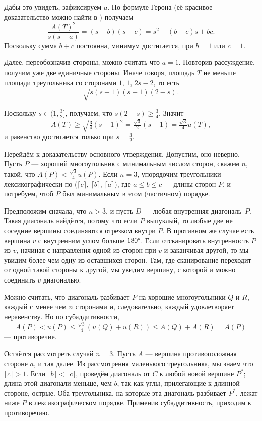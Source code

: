 Дабы это увидеть, зафиксируем $a$. 
По формуле Герона (её красивое доказательство можно найти в \cite{39}) получаем
\[\frac{A(T)^2}{s(s-a)}=(s-b)(s-c)=s^2-(b+c)s+bc.\]
Поскольку сумма $b + c$ постоянна, минимум достигается, при $b = 1$ или $c = 1$.

Далее, переобозначив стороны, можно считать что $a = 1$.
Повторив рассуждение, получим уже две единичные стороны.
Иначе говоря, площадь $T$ не меньше площади треугольника со сторонами $1$, $1$, $2s - 2$, то есть \[\sqrt{s(s-1)(s-1)(2-s)}.\]

Поскольку $s\in(1,\tfrac32]$, получаем, что $s(2-s)\geqslant \tfrac34$.
Значит 
\[A(T)\ge \sqrt{\tfrac34(s-1)^2}=\tfrac{\sqrt{3}}2(s-1)=\tfrac{\sqrt{3}}4u(T),\]
и равенство достигается только при $s=\tfrac32$.

Перейдём к доказательству основного утверждения.
Допустим, оно неверно.
Пусть $P$ --- хороший многоугольник с минимальным числом сторон, скажем $n$, такой, что $A(P)<\tfrac{\sqrt{3}}4 u(P)$.
Если $n=3$, упорядочим треугольники лексикографически по ($\lceil c\rceil$, $\lceil b\rceil$, $\lceil a\rceil$), где 
$a\leqslant b\leqslant c$ --- длины сторон $P$, и потребуем, чтоб $P$ был минимальным в этом (частичном) порядке.

Предположим сначала, что $n>3$, и пусть $D$ --- любая внутренняя диагональ~$P$.
Такая диагональ найдётся, потому что если $P$ выпуклый, то любые две не соседние вершины соединяются отрезком внутри $P$.
В противном же случае есть вершина $v$ с внутренним углом больше $180\degree$.
Если отсканировать внутренность $P$ из $v$, начиная с направления одной из сторон при $v$ и заканчивая другой,
то мы увидим более чем одну из оставшихся сторон.
Там, где сканирование переходит от одной такой стороны к другой, мы увидим вершину, с которой и можно соединить $v$ диагональю.

Можно считать, что диагональ разбивает $P$ на хорошие многоугольники $Q$ и $R$, каждый с менее чем $n$ сторонами и, следовательно, каждый удовлетворяет неравенству.
Но по субаддитивности, 
\[A(P)<u(P)\leqslant \tfrac{\sqrt{3}}4(u(Q)+u(R))\leqslant A(Q)+A(R)=A(P)\]
--- противоречие.

Остаётся рассмотреть случай $n=3$.
Пусть $A$ --- вершина противоположная стороне $a$, и так далее.
Из рассмотрения маленького треугольника, мы знаем что $\lceil c\rceil>1$.
Если $\lceil b\rceil<\lceil c\rceil$, проведём диагональ от $C$ к любой новой вершине $P^*$;
длина этой диагонали меньше, чем $b$, так как углы, прилегающие к длинной стороне, острые.
Оба треугольника, на которые эта диагональ разбивает $P^*$, лежат ниже $P$ в лексикографическом порядке.
Применив субаддитивность, приходим к противоречию.

